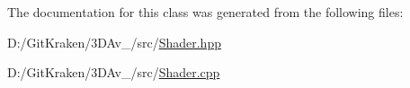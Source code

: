 The documentation for this class was generated from the following files\+:\begin{DoxyCompactItemize}
\item 
D\+:/\+Git\+Kraken/3\+D\+Av\+\_/src/\mbox{\hyperlink{_shader_8hpp}{Shader.\+hpp}}\item 
D\+:/\+Git\+Kraken/3\+D\+Av\+\_/src/\mbox{\hyperlink{_shader_8cpp}{Shader.\+cpp}}\end{DoxyCompactItemize}
